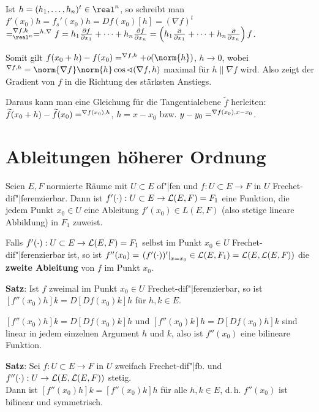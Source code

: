 Ist $h = (h_1, \dotsc, h_n)^t \in \real^n$, so schreibt man
$f'(x_0)h = f_s'(x_0)h = Df(x_0)[h] =
(\nabla f)^t$ 
$= \sp{\nabla f, h}_{\real^n} = \sp{h, \nabla} f =
h_1 \frac{\partial f}{\partial x_1} + \dotsb +
h_n \frac{\partial f}{\partial x_n} =
\left(h_1 \frac{\partial}{\partial x_1} + \dotsb +
h_n \frac{\partial}{\partial x_n}\right) f$.

Somit gilt $f(x_0 + h) - f(x_0) = \sp{\nabla f, h} + o(\norm{h})$, $h \to 0$,
wobei $\sp{\nabla f, h} =
\norm{\nabla f} \norm{h} \cos \sphericalangle(\nabla f, h)$ maximal für
$h \parallel \nabla f$ wird.
Also zeigt der Gradient von $f$ in die Richtung des stärksten Anstiegs.

Daraus kann man eine Gleichung für die Tangentialebene $\widetilde{f}$
herleiten: \\
$\widetilde{f}(x_0 + h) - \widetilde{f}(x_0) = \sp{\nabla f(x_0), h}$,
$h = x - x_0$ bzw.
$y - y_0 = \sp{\nabla f(x_0), x - x_0}$.

\section{%
    Ableitungen höherer Ordnung%
}

Seien $E, F$ normierte Räume mit $U \subset E$ of"|fen und
$f: U \subset E \rightarrow F$ in $U$ Frechet-dif"|ferenzierbar.
Dann ist $f'(\cdot): U \subset E \rightarrow \mathcal{L}(E, F) = F_1$ eine Funktion,
die jedem Punkt $x_0 \in U$ eine Ableitung $f'(x_0) \in L(E, F)$
(also stetige lineare Abbildung) in $F_1$ zuweist.

Falls $f'(\cdot): U \subset E \rightarrow \mathcal{L}(E, F) = F_1$ selbst im
Punkt $x_0 \in U$ Frechet-dif"|ferenzierbar ist, so ist
$f''(x_0) = \left.(f'(\cdot))'\right|_{x=x_0} \in \mathcal{L}(E, F_1) = \mathcal{L}(E, \mathcal{L}(E, F))$
die \textbf{zweite Ableitung} von $f$ im Punkt $x_0$.

\linie

\textbf{Satz}:
Ist $f$ zweimal im Punkt $x_0 \in U$ Frechet-dif"|ferenzierbar, so ist
$[f''(x_0)h]k = D[Df(x_0)k]h$ für $h, k \in E$.

$[f''(x_0)h]k = D[Df(x_0)k]h$ und $[f''(x_0)k]h = D[Df(x_0)h]k$
sind linear in jedem einzelnen Argument $h$ und $k$, also ist
$f''(x_0)$ eine bilineare Funktion.

\textbf{Satz}:
Sei $f: U \subset E \rightarrow F$ in $U$ zweifach Frechet-dif"|fb.
und $f''(\cdot): U \rightarrow \mathcal{L}(E, \mathcal{L}(E, F))$ stetig. \\
Dann ist $[f''(x_0)h]k = [f''(x_0)k]h$ für alle $h, k \in E$, d.\,h.
$f''(x_0)$ ist bilinear und symmetrisch.

